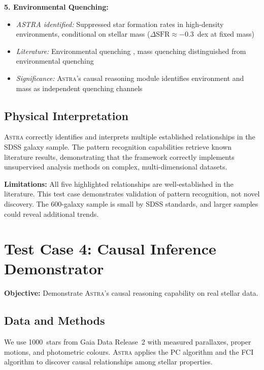 \documentclass[fleqn,usenatbib]{mnras}
\newcommand{\astra}{\textsc{Astra}\xspace}
\newcommand{\pc}{PC\xspace}
\newcommand{\fci}{FCI\xspace}
\begin{document}
\textbf{5. Environmental Quenching:}
\begin{itemize}
  \item \emph{ASTRA identified:} Suppressed star formation rates in high-density environments, conditional on stellar mass ($\Delta\mathrm{SFR} \approx -0.3$~dex at fixed mass)
  \item \emph{Literature:} Environmental quenching \citep{Peng2010}, mass quenching distinguished from environmental quenching
  \item \emph{Significance:} \astra's causal reasoning module identifies environment and mass as independent quenching channels
\end{itemize}

\subsection{Physical Interpretation}
\label{sec:tc3:interpretation}

\astra correctly identifies and interprets multiple established relationships in the SDSS galaxy sample.
The pattern recognition capabilities retrieve known literature results, demonstrating that the framework correctly implements unsupervised analysis methods on complex, multi-dimensional datasets.

\textbf{Limitations:} All five highlighted relationships are well-established in the literature.
This test case demonstrates validation of pattern recognition, not novel discovery.
The 600-galaxy sample is small by SDSS standards, and larger samples could reveal additional trends.

\section{Test Case 4: Causal Inference Demonstrator}
\label{sec:tc4}

\textbf{Objective:} Demonstrate \astra's causal reasoning capability on real stellar data.

\subsection{Data and Methods}
\label{sec:tc4:data}

We use 1000~stars from Gaia Data Release~2 \citep{GaiaCollaboration2018} with measured parallaxes, proper motions, and photometric colours.
\astra applies the \pc algorithm \citep{Spirtes2000} and the \fci algorithm \citep{Zhang2008} to discover causal relationships among stellar properties.
\end{document}
